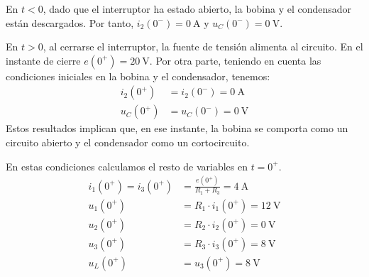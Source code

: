 \documentclass[12pt]{article}
\begin{document}
En $t < 0$, dado que el interruptor ha estado abierto, la bobina y el condensador están descargados. Por tanto, $i_2(0^-) = \qty{0}{\ampere}$ y $u_C(0^-) = \qty{0}{\volt}$.

\smallskip
\begin{minipage}{0.6\linewidth}
En $t > 0$, al cerrarse el interruptor, la fuente de tensión alimenta al circuito. En el instante de cierre $e(0^+) = \qty{20}{\volt}$. Por otra parte, teniendo en cuenta las condiciones iniciales en la bobina y el condensador, tenemos:
\begin{align*}
  i_2(0^+) &= i_2(0^-) = \qty{0}{\ampere}\\
  u_C(0^+) &= u_C(0^-) = \qty{0}{\volt}
\end{align*}
Estos resultados implican que, en ese instante, la bobina se comporta como un circuito abierto y el condensador como un cortocircuito. 
\end{minipage}
\begin{minipage}{0.4\linewidth}
\end{minipage}
\smallskip

En estas condiciones calculamos el resto de variables en $t = 0^+$.
\begin{align*}
  i_1(0^+) = i_3(0^+) &= \frac{e(0^+)}{R_1 + R_3} = \qty{4}{\ampere}\\
  u_1(0^+) &= R_1 \cdot i_1(0^+) = \qty{12}{\volt}\\
  u_2(0^+) &= R_2 \cdot i_2(0^+) = \qty{0}{\volt}\\
  u_3(0^+) &= R_3 \cdot i_3(0^+) = \qty{8}{\volt}\\
  u_L(0^+) &= u_3(0^+) = \qty{8}{\volt}
\end{align*}
\end{document}
